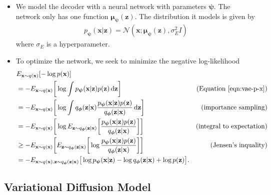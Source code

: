 \documentclass[10pt]{article}
\newcommand{\dee}{\mathrm{d}}
\newcommand{\ve}[1]{\mathbf{#1}}
\newcommand{\ves}[1]{\boldsymbol{#1}}
\newcommand{\mcal}[1]{\mathcal{#1}}
\begin{document}
\begin{itemize}
  \item We model the decoder with a neural network with parameters $\ves{\psi}$. The network only has one function $\ves{\mu}_{\ves{\psi}}(\ve{z})$. The distribution it models is given by
  \begin{align*}
    p_{\ves{\psi}}(\ve{x}|\ve{z}) = \mcal{N}(\ve{x};\ves{\mu}_{\ves{\psi}}(\ve{z}), \sigma_E^2 I)
  \end{align*}
  where $\sigma_E$ is a hyperparameter.

  \item To optimize the network, we seek to minimize the negative log-likelihood
  \begin{align*}
    &E_{\ve{x} \sim q(\ve{x})} [-\log p(\ve{x})] & \\    
    &= - E_{\ve{x} \sim q(\ve{x})} \bigg[ \log \int p_{\ves{\psi}}(\ve{x}|\ve{z}) p(\ve{z})\, \dee\ve{z} \bigg] 
    & (\mbox{Equation~\ref{eqn:vae-p-x}})
    \\
    &= - E_{\ve{x} \sim q(\ve{x})} \bigg[ \log \int q_{\ves{\phi}}(\ve{z}|\ve{x}) \frac{p_{\ves{\psi}}(\ve{x}|\ve{z}) p(\ve{z})}{q_{\ves{\phi}}(\ve{z}|\ve{x})} \, \dee\ve{z} \bigg] 
    & (\mbox{importance sampling})
    \\
    &= - E_{\ve{x} \sim q(\ve{x})} \bigg[ \log E_{\ve{z} \sim q_{\ves{\phi}}(\ve{z}|\ve{x})} \bigg[ \frac{p_{\ves{\psi}}(\ve{x}|\ve{z}) p(\ve{z})}{q_{\ves{\phi}}(\ve{z}|\ve{x})} \bigg] \bigg] 
    & (\mbox{integral to expectation})
    \\
    &\geq  - E_{\ve{x} \sim q(\ve{x})} \bigg[ E_{\ve{z} \sim q_{\ves{\phi}}(\ve{z}|\ve{x})} \bigg[ \log \frac{p_{\ves{\psi}}(\ve{x}|\ve{z}) p(\ve{z})}{q_{\ves{\phi}}(\ve{z}|\ve{x})} \bigg] \bigg]
    & (\mbox{Jensen's inquality}) \\
    &= - E_{\ve{x} \sim q(\ve{x}), \ve{z} \sim q_{\ves{\phi}}(\ve{z}|\ve{x})} \big[ \log p_{\ves{\psi}}(\ve{x}|\ve{z}) - \log q_{\ves{\phi}}(\ve{z}|\ve{x}) + \log p(\ve{z}) \big].
    & 
  \end{align*}  
  
\end{itemize}

\subsection{Variational Diffusion Model}
\end{document}
